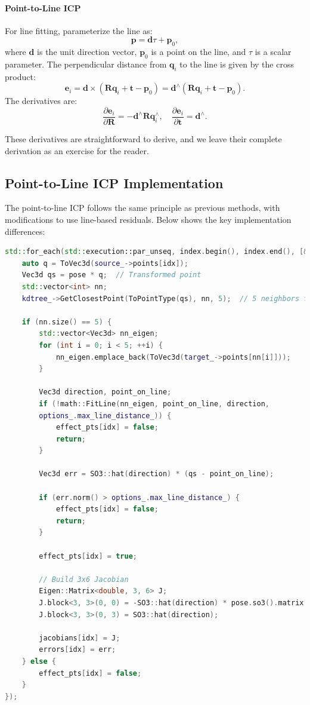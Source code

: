 \paragraph{Point-to-Line ICP}  
For line fitting, parameterize the line as:
\begin{equation}\label{key}
	\bm{p} = \bm{d} \tau + \bm{p}_0,
\end{equation}
where $\bm{d}$ is the unit direction vector, $\bm{p}_0$ is a point on the line, and $\tau$ is a scalar parameter. The perpendicular distance from $\bm{q}_i$ to the line is given by the cross product:
\begin{equation}\label{key}
	\bm{e}_i = \bm{d} \times (\bm{R} \bm{q}_i + \bm{t} - \bm{p}_0) = \bm{d}^\wedge (\bm{R} \bm{q}_i + \bm{t} - \bm{p}_0).
\end{equation}
The derivatives are:
\begin{equation}\label{key}
	\frac{\partial \bm{e}_i}{\partial \bm{R}} = -\bm{d}^\wedge \bm{R} \bm{q}_i^\wedge, \quad \frac{\partial \bm{e}_i}{\partial \bm{t}} = \bm{d}^\wedge.
\end{equation}

These derivatives are straightforward to derive, and we leave their complete derivation as an exercise for the reader.

\subsection{Point-to-Line ICP Implementation}
The point-to-line ICP follows the same principle as previous methods, with modifications to use line-based residuals. Below shows the key implementation differences:

\begin{lstlisting}[language=c++,caption=ch7/icp\_3d.cc]
std::for_each(std::execution::par_unseq, index.begin(), index.end(), [&](int idx) {
	auto q = ToVec3d(source_->points[idx]);
	Vec3d qs = pose * q;  // Transformed point
	std::vector<int> nn;
	kdtree_->GetClosestPoint(ToPointType(qs), nn, 5);  // 5 neighbors for line fitting
	
	if (nn.size() == 5) {
		std::vector<Vec3d> nn_eigen;
		for (int i = 0; i < 5; ++i) {
			nn_eigen.emplace_back(ToVec3d(target_->points[nn[i]]));
		}
		
		Vec3d direction, point_on_line;
		if (!math::FitLine(nn_eigen, point_on_line, direction, 
		options_.max_line_distance_)) {
			effect_pts[idx] = false;
			return;
		}
		
		Vec3d err = SO3::hat(direction) * (qs - point_on_line);
		
		if (err.norm() > options_.max_line_distance_) {
			effect_pts[idx] = false;
			return;
		}
		
		effect_pts[idx] = true;
		
		// Build 3x6 Jacobian
		Eigen::Matrix<double, 3, 6> J;
		J.block<3, 3>(0, 0) = -SO3::hat(direction) * pose.so3().matrix() * SO3::hat(q);
		J.block<3, 3>(0, 3) = SO3::hat(direction);
		
		jacobians[idx] = J;
		errors[idx] = err;
	} else {
		effect_pts[idx] = false;
	}
});
\end{lstlisting}

